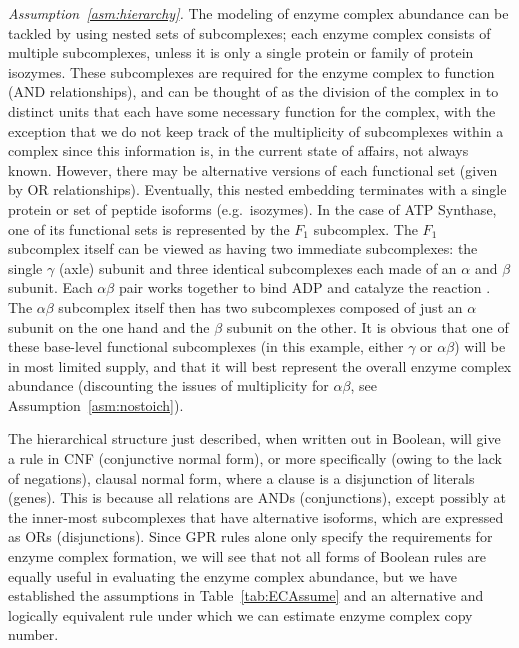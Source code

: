 \emph{Assumption~\ref{asm:hierarchy}.}
The modeling of enzyme complex abundance can be tackled by using
nested sets of subcomplexes; each enzyme complex consists of multiple
subcomplexes, unless it is only a single protein or family of protein
isozymes.  These subcomplexes are required for the enzyme complex to
function (AND relationships), and can be thought of as the division of
the complex in to distinct units that each have some necessary
function for the complex, with the exception that we do not keep track
of the multiplicity of subcomplexes within a complex since this
information is, in the current state of affairs, not always known.
However, there may be alternative versions of each functional set
(given by OR relationships). Eventually, this nested embedding
terminates with a single protein or set of peptide isoforms
(e.g.\ isozymes).  In the case of ATP Synthase, one of its functional
sets is represented by the $F_1$ subcomplex. The $F_1$ subcomplex
itself can be viewed as having two immediate subcomplexes: the single
$\gamma$ (axle) subunit and three identical subcomplexes each made of
an $\alpha$ and $\beta$ subunit. Each $\alpha\beta$ pair works
together to bind ADP and catalyze the reaction \citep{Oster2003}. The
$\alpha\beta$ subcomplex itself then has two subcomplexes composed of
just an $\alpha$ subunit on the one hand and the $\beta$ subunit on
the other.  It is obvious that one of these base-level functional
subcomplexes (in this example, either $\gamma$ or $\alpha\beta$) will
be in most limited supply, and that it will best represent the overall
enzyme complex abundance (discounting the issues of multiplicity for
$\alpha\beta$, see Assumption~\ref{asm:nostoich}).

%
%

The hierarchical structure just described, when written out in
Boolean, will give a rule in CNF (conjunctive normal form), or more
specifically (owing to the lack of negations), clausal normal form,
where a clause is a disjunction of literals (genes). This is because all
relations are ANDs (conjunctions), except possibly at the inner-most
subcomplexes that have alternative isoforms, which are expressed as
ORs (disjunctions). Since GPR rules alone only specify the
requirements for enzyme complex formation, we will see that not all
forms of Boolean rules are equally useful in evaluating the enzyme
complex abundance, but we have established the assumptions in \suppOrApp
Table~\ref{tab:ECAssume} and an alternative and logically equivalent rule
\citep{Russell2009} under which we can estimate enzyme complex copy
number.

